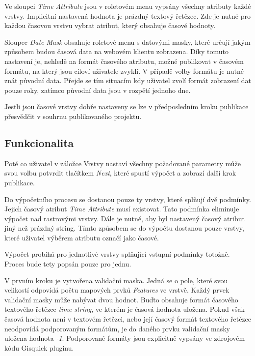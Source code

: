 Ve sloupci \textit{Time Attribute} jsou v roletovém menu vypsány všechny atributy každé vrstvy. Implicitní nastavená hodnota je prázdný textový řetězec. Zde je nutné pro každou časovou vrstvu vybrat atribut, který obsahuje časové hodnoty. 

Sloupec \textit{Date Mask} obsahuje roletové menu s datovými masky, které určují jakým způsobem budou časová data na webovém klientu zobrazena. Díky tomuto nastavení je, nehledě na formát časového atributu, možné publikovat v časovém formátu, na který jsou cíloví uživatele zvyklí. V případě volby formátu je nutné znát původní data. Přejde se tím situacím kdy uživatel zvolí formát zobrazení dat pouze roky, zatímco původní data jsou v rozpětí jednoho dne.

Jestli jsou časové vrstvy dobře nastaveny se lze v předposledním kroku publikace přesvědčit v souhrnu publikovaného projektu.

\subsection{Funkcionalita}

Poté co uživatel v záložce Vrstvy nastaví všechny požadované parametry může svou volbu potvrdit tlačítkem \textit{Next}, které spustí výpočet a zobrazí další krok publikace.

Do výpočetního procesu se dostanou pouze ty vrstvy, které splňují dvě podmínky. Jejich časový atribut \textit{Time Attribute} musí existovat. Tato podmínka eliminuje výpočet nad rastrovými vrstvy. Dále je nutné, aby byl nastavený časový atribut jiný než prázdný string. Tímto způsobem se do výpočtu dostanou pouze vrstvy, které uživatel výběrem atributu označí jako časové.

Výpočet probíhá pro jednotlivé vrstvy splňující vstupní podmínky totožně. Proces bude tety popsán pouze pro jednu.

V prvním kroku je vytvořena validační maska. Jedná se o pole, které svou velikostí odpovídá počtu mapových prvků \textit{Features} ve vrstvě. Každý prvek validační masky může nabývat dvou hodnot. Buďto obsahuje formát časového textového řetězce \textit{time string}, ve kterém je časová hodnota uložena. Pokud však časová hodnota není v textovém řetězci, nebo její časový formát textového řetězce neodpovídá podporovaným formátům, je do daného prvku validační masky uložena hodnota \textit{-1}. Podporované formáty jsou explicitně vypsány ve zdrojovém kódu Gisquick pluginu.

